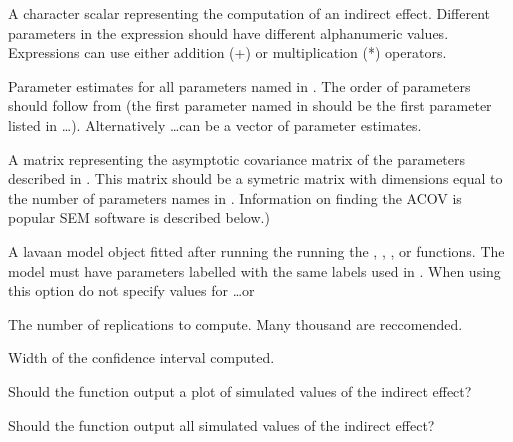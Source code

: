 \documentclass[a4paper]{book}
\begin{document}
%
\begin{Arguments}
\begin{ldescription}
\item[\code{expression}] A character scalar representing the computation of an indirect effect. Different parameters in the expression should have different alphanumeric values. Expressions can use either addition (+) or multiplication (*) operators.
\item[\code{...}] Parameter estimates for all parameters named in . The order of parameters should follow from  (the first parameter named in  should be the first parameter listed in \dots). Alternatively \dots can be a vector of parameter estimates.
\item[\code{ACM}] A matrix representing the asymptotic covariance matrix of the parameters described in . This matrix should be a symetric matrix with dimensions equal to the number of parameters names in . Information on finding the ACOV is popular SEM software is described below.)
\item[\code{object}] A lavaan model object fitted after running the running the , , , or  functions. The model must have parameters labelled with the same labels used in . When using this option do not specify values for \dots or 
\item[\code{rep}] The number of replications to compute. Many thousand are reccomended.	
\item[\code{CI}] Width of the confidence interval computed.
\item[\code{plot}] Should the function output a plot of simulated values of the indirect effect?
\item[\code{outputValues}] Should the function output all simulated values of the indirect effect?

\end{ldescription}
\end{Arguments}
%
\end{document}

